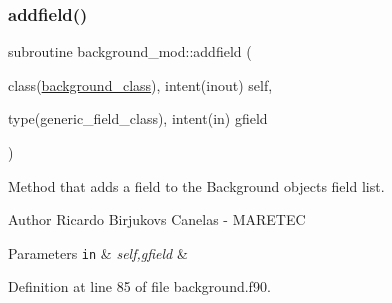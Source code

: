 \subsubsection{\texorpdfstring{addfield()}{addfield()}}
{\footnotesize\ttfamily subroutine background\+\_\+mod\+::addfield (\begin{DoxyParamCaption}\item[{class(\mbox{\hyperlink{structbackground__mod_1_1background__class}{background\+\_\+class}}), intent(inout)}]{self,  }\item[{type(generic\+\_\+field\+\_\+class), intent(in)}]{gfield }\end{DoxyParamCaption})\hspace{0.3cm}{\ttfamily [private]}}



Method that adds a field to the Background object\textquotesingle{}s field list. 

\begin{DoxyAuthor}{Author}
Ricardo Birjukovs Canelas -\/ M\+A\+R\+E\+T\+EC 
\end{DoxyAuthor}

\begin{DoxyParams}[1]{Parameters}
\mbox{\tt in}  & {\em self,gfield} & \\
\hline
\end{DoxyParams}


Definition at line 85 of file background.\+f90.


